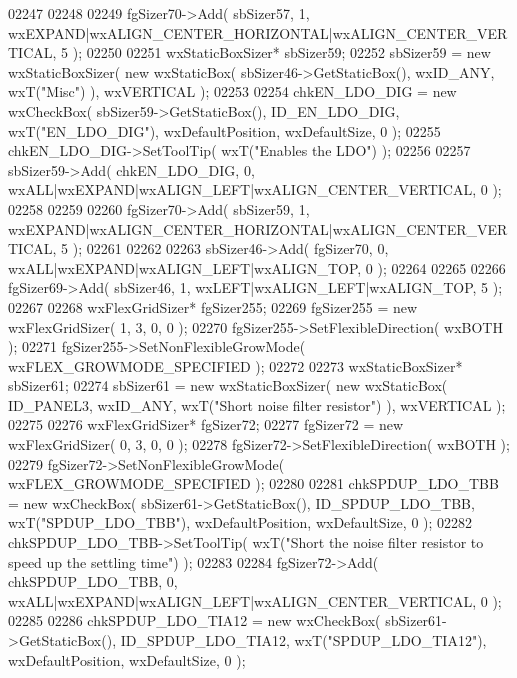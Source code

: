 \begin{DoxyCode}
02247     
02248     
02249     fgSizer70->Add( sbSizer57, 1, wxEXPAND|wxALIGN\_CENTER\_HORIZONTAL|wxALIGN\_CENTER\_VERTICAL, 5 );
02250     
02251     wxStaticBoxSizer* sbSizer59;
02252     sbSizer59 = \textcolor{keyword}{new} wxStaticBoxSizer( \textcolor{keyword}{new} wxStaticBox( sbSizer46->GetStaticBox(), wxID\_ANY, wxT(\textcolor{stringliteral}{"Misc"}) ), 
      wxVERTICAL );
02253     
02254     chkEN_LDO_DIG = \textcolor{keyword}{new} wxCheckBox( sbSizer59->GetStaticBox(), ID_EN_LDO_DIG, wxT(\textcolor{stringliteral}{"EN\_LDO\_DIG"}), 
      wxDefaultPosition, wxDefaultSize, 0 );
02255     chkEN_LDO_DIG->SetToolTip( wxT(\textcolor{stringliteral}{"Enables the LDO"}) );
02256     
02257     sbSizer59->Add( chkEN_LDO_DIG, 0, wxALL|wxEXPAND|wxALIGN\_LEFT|wxALIGN\_CENTER\_VERTICAL, 0 );
02258     
02259     
02260     fgSizer70->Add( sbSizer59, 1, wxEXPAND|wxALIGN\_CENTER\_HORIZONTAL|wxALIGN\_CENTER\_VERTICAL, 5 );
02261     
02262     
02263     sbSizer46->Add( fgSizer70, 0, wxALL|wxEXPAND|wxALIGN\_LEFT|wxALIGN\_TOP, 0 );
02264     
02265     
02266     fgSizer69->Add( sbSizer46, 1, wxLEFT|wxALIGN\_LEFT|wxALIGN\_TOP, 5 );
02267     
02268     wxFlexGridSizer* fgSizer255;
02269     fgSizer255 = \textcolor{keyword}{new} wxFlexGridSizer( 1, 3, 0, 0 );
02270     fgSizer255->SetFlexibleDirection( wxBOTH );
02271     fgSizer255->SetNonFlexibleGrowMode( wxFLEX\_GROWMODE\_SPECIFIED );
02272     
02273     wxStaticBoxSizer* sbSizer61;
02274     sbSizer61 = \textcolor{keyword}{new} wxStaticBoxSizer( \textcolor{keyword}{new} wxStaticBox( ID_PANEL3, wxID\_ANY, wxT(\textcolor{stringliteral}{"Short noise filter
       resistor"}) ), wxVERTICAL );
02275     
02276     wxFlexGridSizer* fgSizer72;
02277     fgSizer72 = \textcolor{keyword}{new} wxFlexGridSizer( 0, 3, 0, 0 );
02278     fgSizer72->SetFlexibleDirection( wxBOTH );
02279     fgSizer72->SetNonFlexibleGrowMode( wxFLEX\_GROWMODE\_SPECIFIED );
02280     
02281     chkSPDUP_LDO_TBB = \textcolor{keyword}{new} wxCheckBox( sbSizer61->GetStaticBox(), 
      ID_SPDUP_LDO_TBB, wxT(\textcolor{stringliteral}{"SPDUP\_LDO\_TBB"}), wxDefaultPosition, wxDefaultSize, 0 );
02282     chkSPDUP_LDO_TBB->SetToolTip( wxT(\textcolor{stringliteral}{"Short the noise filter resistor to speed up the settling time"}) );
02283     
02284     fgSizer72->Add( chkSPDUP_LDO_TBB, 0, wxALL|wxEXPAND|wxALIGN\_LEFT|wxALIGN\_CENTER\_VERTICAL, 0 );
02285     
02286     chkSPDUP_LDO_TIA12 = \textcolor{keyword}{new} wxCheckBox( sbSizer61->GetStaticBox(), 
      ID_SPDUP_LDO_TIA12, wxT(\textcolor{stringliteral}{"SPDUP\_LDO\_TIA12"}), wxDefaultPosition, wxDefaultSize, 0 );

\end{DoxyCode}
